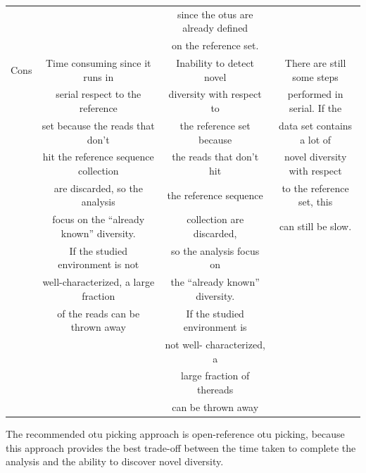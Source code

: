 \begin{table}
\begin{tabular*}{\textwidth}{cccc}
     &                         & since the \gls{otu}s are already defined & \\
     &                         & on the reference set. & \\
\midrule
Cons & Time consuming since it runs in         & Inability to detect novel      & There are still some steps\\
     & serial respect to the reference         & diversity with respect to      & performed in serial. If the\\
     & set because the reads that don’t        & the reference set because      & data set contains a lot of\\
     & hit the reference sequence collection   & the reads that don’t hit       & novel diversity with respect\\
     &  are discarded, so the analysis         & the reference sequence         & to the reference set, this\\
     & focus on the “already known” diversity. & collection are discarded,      & can still be slow.\\
     & If the studied environment is not       & so the analysis focus on       &\\
     & well-characterized, a large fraction    & the “already known” diversity. &\\
     & of the reads can be thrown away         & If the studied environment is  &\\
     &                                         & not well- characterized, a     &\\
     &                                         & large fraction of thereads     &\\
     &                                         & can be thrown away             &\\
\bottomrule
\end{tabular*}
\end{table}
\renewcommand{\arraystretch}{1}%

The recommended \gls{otu} picking approach is open-reference \gls{otu} picking,
because this approach provides the best trade-off between the time taken to complete
the analysis and the ability to discover novel diversity.

